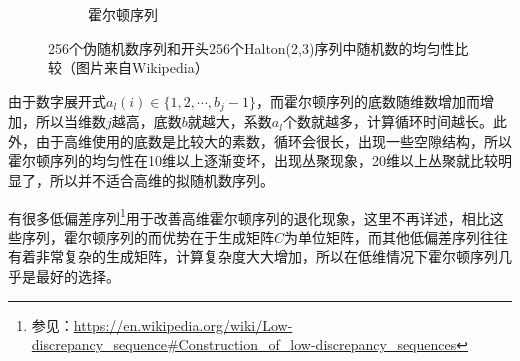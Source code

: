 \begin{figure}
{\begin{subfigure}[b]{0.3\textwidth}
		\caption{霍尔顿序列}
	\end{subfigure}}
	\caption{256个伪随机数序列和开头256个Halton(2,3)序列中随机数的均匀性比较（图片来自Wikipedia） }
	\label{f:mc-halton}
\end{figure}

由于数字展开式$a_l(i)\in \{1,2,\cdots,b_j-1 \}$，而霍尔顿序列的底数随维数增加而增加，所以当维数$j$越高，底数$b$就越大，系数$a_l$个数就越多，计算循环时间越长。此外，由于高维使用的底数是比较大的素数，循环会很长，出现一些空隙结构，所以霍尔顿序列的均匀性在10维以上逐渐变坏，出现丛聚现象，20维以上丛聚就比较明显了，所以并不适合高维的拟随机数序列。

有很多低偏差序列\footnote{参见：\url{https://en.wikipedia.org/wiki/Low-discrepancy_sequence\#Construction_of_low-discrepancy_sequences}}用于改善高维霍尔顿序列的退化现象，这里不再详述，相比这些序列，霍尔顿序列的而优势在于生成矩阵$C$为单位矩阵，而其他低偏差序列往往有着非常复杂的生成矩阵，计算复杂度大大增加，所以在低维情况下霍尔顿序列几乎是最好的选择。
